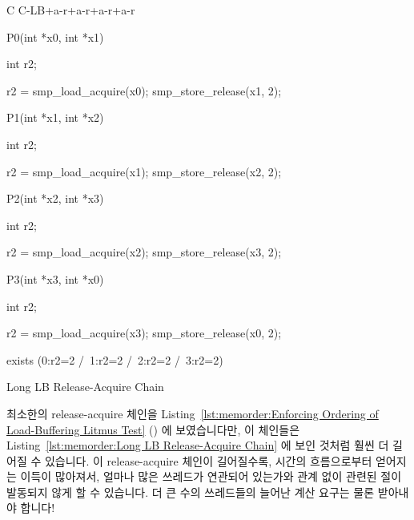 \begin{listing}[tbp]
{ \scriptsize
\begin{verbbox}[\LstLineNo]
C C-LB+a-r+a-r+a-r+a-r
{
}

P0(int *x0, int *x1)
{
  int r2;

  r2 = smp_load_acquire(x0);
  smp_store_release(x1, 2);
}


P1(int *x1, int *x2)
{
  int r2;

  r2 = smp_load_acquire(x1);
  smp_store_release(x2, 2);
}

P2(int *x2, int *x3)
{
  int r2;

  r2 = smp_load_acquire(x2);
  smp_store_release(x3, 2);
}

P3(int *x3, int *x0)
{
  int r2;

  r2 = smp_load_acquire(x3);
  smp_store_release(x0, 2);
}

exists (0:r2=2 /\ 1:r2=2 /\ 2:r2=2 /\ 3:r2=2)
\end{verbbox}
}
\centering
\theverbbox
\caption{Long LB Release-Acquire Chain}
\label{lst:memorder:Long LB Release-Acquire Chain}
\end{listing}

최소한의 release-acquire 체인을
Listing~\ref{lst:memorder:Enforcing Ordering of Load-Buffering Litmus Test}
()
에 보였습니다만, 이 체인들은
Listing~\ref{lst:memorder:Long LB Release-Acquire Chain}
에 보인 것처럼 훨씬 더 길어질 수 있습니다.
이 release-acquire 체인이 길어질수록, 시간의 흐름으로부터 얻어지는 이득이
많아져서, 얼마나 많은 쓰레드가 연관되어 있는가와 관계 없이 관련된 
절이 발동되지 않게 할 수 있습니다.
더 큰 수의 쓰레드들의 늘어난 계산 요구는 물론 받아내야 합니다!

